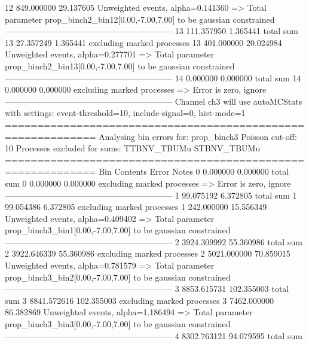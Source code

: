 12         849.000000      29.137605       Unweighted events, alpha=0.141360
  => Total parameter prop_binch2_bin12[0.00,-7.00,7.00] to be gaussian constrained
------------------------------------------------------------
13         111.357950      1.365441        total sum                     
13         27.357249       1.365441        excluding marked processes    
13         401.000000      20.024984       Unweighted events, alpha=0.277701
  => Total parameter prop_binch2_bin13[0.00,-7.00,7.00] to be gaussian constrained
------------------------------------------------------------
14         0.000000        0.000000        total sum                     
14         0.000000        0.000000        excluding marked processes    
  => Error is zero, ignore      
------------------------------------------------------------
Channel ch3 will use autoMCStats with settings: event-threshold=10, include-signal=0, hist-mode=1
============================================================
Analysing bin errors for: prop_binch3
Poisson cut-off: 10
Processes excluded for sums: TTBNV_TBUMu STBNV_TBUMu
============================================================
Bin        Contents        Error           Notes                         
0          0.000000        0.000000        total sum                     
0          0.000000        0.000000        excluding marked processes    
  => Error is zero, ignore      
------------------------------------------------------------
1          99.075192       6.372805        total sum                     
1          99.054386       6.372805        excluding marked processes    
1          242.000000      15.556349       Unweighted events, alpha=0.409402
  => Total parameter prop_binch3_bin1[0.00,-7.00,7.00] to be gaussian constrained
------------------------------------------------------------
2          3924.309992     55.360986       total sum                     
2          3922.646339     55.360986       excluding marked processes    
2          5021.000000     70.859015       Unweighted events, alpha=0.781579
  => Total parameter prop_binch3_bin2[0.00,-7.00,7.00] to be gaussian constrained
------------------------------------------------------------
3          8853.615731     102.355003      total sum                     
3          8841.572616     102.355003      excluding marked processes    
3          7462.000000     86.382869       Unweighted events, alpha=1.186494
  => Total parameter prop_binch3_bin3[0.00,-7.00,7.00] to be gaussian constrained
------------------------------------------------------------
4          8302.763121     94.079595       total sum                     
